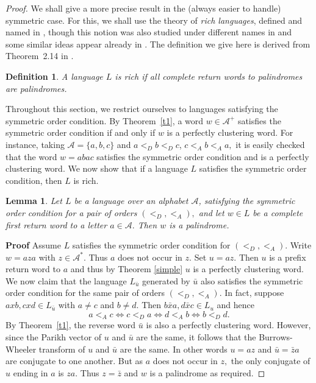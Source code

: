 \documentclass[12pt,a4paper]{amsart}
\newtheorem{lemma}[theorem]{Lemma}
\newtheorem{definition}{Definition}
\begin{document}
\begin{proof}
We shall give a more precise result in the (always easier to handle) symmetric case.
For this, we shall use the  theory of {\it rich languages}, defined and named in \cite{gjwz}, though this notion was also studied under different names in \cite{bdgz} and some similar ideas  appear already in \cite{bhnr}. The definition we give here is derived from 
Theorem~2.14 in \cite{gjwz}.

\begin{definition} A language $L$  is rich if  all complete return words to palindromes are palindromes.
\end{definition}

Throughout this section, we restrict ourselves to languages satisfying the symmetric order condition.   By Theorem~\ref{t1}, a word $w\in \mathcal A^+$ satisfies the symmetric order condition if and only if $w$ is a perfectly clustering word. For instance, taking $\mathcal A=\{a,b,c\}$ and $a<_D b<_D c$, $c<_A b<_A a,$ it is easily checked that the word $w=abac$ satisfies the symmetric order condition and is a perfectly clustering word. We now show that if a language $L$ satisfies the symmetric order condition, then $L$ is rich.   

\begin{lemma}\label{aric} Let $L$ be a language over an alphabet $\mathcal A$, satisfying the symmetric order condition for a pair of orders $(<_D, <_A),$ and let $w\in L$ be a complete first return word to a letter $a\in \mathcal A.$ Then $w$ is a palindrome.    
\end{lemma}

{\bf Proof} Assume $L$  satisfies the symmetric order condition for $(<_D, <_A).$ Write $w=aza$ with $z\in \mathcal A^*.$ Thus $a$ does not occur in $z.$ Set $u=az.$ Then $u$ is a prefix  return word to $a$ and thus by Theorem \ref{simple} $u$ is a perfectly clustering word. We now claim that the language $L_{\bar u}$  generated by $\bar u$ also satisfies the symmetric order condition for the same pair of orders $(<_D,<_A).$ In fact, suppose $axb, cxd \in L_{\bar u}$ with $a\neq c$ and $b\neq d.$ Then $b\bar x a, d\bar x c \in L_u$ and hence $$a<_A c \Leftrightarrow c<_D a  \Leftrightarrow d<_A b  \Leftrightarrow b<_D d.$$ By Theorem~\ref{t1}, the reverse word $\bar u$ is also a perfectly clustering word. However, since the Parikh vector of $u$ and $\bar u$ are the same, it follows that the Burrows-Wheeler transform of $u$ and $\bar u$ are the same. In other words $u=az$ and $\bar u =\bar z a$ are conjugate to one another. But as $a$ does not occur in $z,$ the only conjugate of $u$ ending in $a$ is $za.$ Thus $z=\bar z$ and  $w$ is a palindrome as required. \end{proof}
\end{document}
